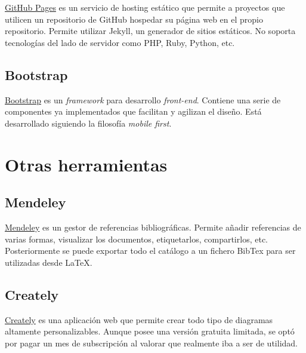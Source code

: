 \href{https://pages.github.com/}{GitHub Pages} es un servicio de hosting
estático que permite a proyectos que utilicen un repositorio de GitHub 
hospedar su página web en el propio repositorio. Permite utilizar Jekyll, un generador de sitios
estáticos. No soporta tecnologías del lado de servidor como PHP, Ruby,
Python, etc.

\subsection{Bootstrap}\label{bootstrap}

\href{http://getbootstrap.com/}{Bootstrap} es un \emph{framework} para
desarrollo \emph{front-end}. Contiene una serie de componentes ya
implementados que facilitan y agilizan el diseño. Está desarrollado
siguiendo la filosofía \emph{mobile first}.

\section{Otras herramientas}\label{otras-herramientas}

\subsection{Mendeley}\label{mendeley}

\href{https://www.mendeley.com/}{Mendeley} es un gestor de referencias
bibliográficas. Permite añadir referencias de varias formas, visualizar
los documentos, etiquetarlos, compartirlos, etc. Posteriormente se puede
exportar todo el catálogo a un fichero BibTex para ser utilizadas desde
\LaTeX.

\subsection{Creately}\label{creately}

\href{https://creately.com/}{Creately} es una aplicación web que permite
crear todo tipo de diagramas altamente personalizables. Aunque posee una
versión gratuita limitada, se optó por pagar un mes de subscripción al
valorar que realmente iba a ser de utilidad.
